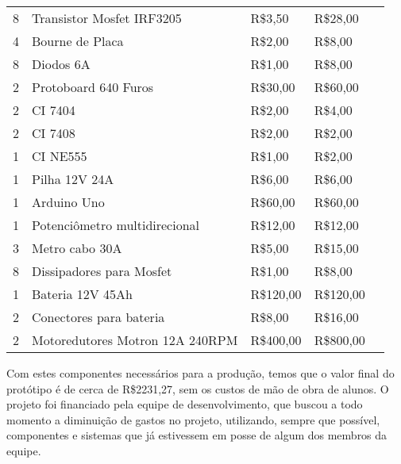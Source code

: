 \begin{table}[]
\begin{tabular}{lllll}
8 & Transistor Mosfet IRF3205 & R\$3,50 & R\$28,00 &  \\
4 & Bourne de Placa & R\$2,00 & R\$8,00 &  \\
8 & Diodos 6A & R\$1,00 & R\$8,00 &  \\
2 & Protoboard 640 Furos & R\$30,00 & R\$60,00 &  \\
2 & CI 7404 & R\$2,00 & R\$4,00 &  \\
2 & CI 7408 & R\$2,00 & R\$2,00 &  \\
1 & CI NE555 & R\$1,00 & R\$2,00 &  \\
1 & Pilha 12V 24A & R\$6,00 & R\$6,00 &  \\
1 & Arduino Uno & R\$60,00 & R\$60,00 &  \\
1 & Potenciômetro multidirecional & R\$12,00 & R\$12,00 &  \\
3 & Metro cabo 30A & R\$5,00 & R\$15,00 &  \\
8 & Dissipadores para Mosfet & R\$1,00 & R\$8,00 &  \\
1 & Bateria 12V 45Ah & R\$120,00 & R\$120,00 &  \\
2 & Conectores para bateria & R\$8,00 & R\$16,00 &  \\
2 & Motoredutores Motron 12A 240RPM & R\$400,00 & R\$800,00 &
\end{tabular}
\end{table}

Com estes componentes necessários para a produção, temos que o valor final do 
protótipo é de cerca de R\$2231,27, sem os custos de mão de obra de alunos. O 
projeto foi financiado pela equipe de desenvolvimento, que buscou a todo 
momento a diminuição de gastos no projeto, utilizando, sempre que possível, 
componentes e sistemas que já estivessem em posse de algum dos membros da equipe.
